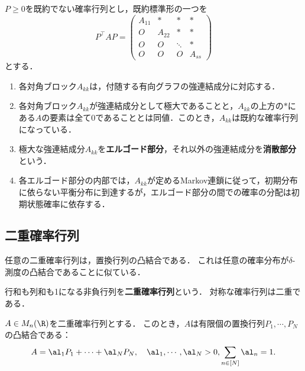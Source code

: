 \documentclass[uplatex, dvipdfmx]{jsreport}
\begin{document}
\begin{definition}
    $P\ge0$を既約でない確率行列とし，既約標準形の一つを
    \[P^\top AP=\begin{pmatrix}A_{11}&*&*&*\\O&A_{22}&*&*\\O&O&\ddots&*\\O&O&O&A_{ss}\end{pmatrix}\]
    とする．
    \begin{enumerate}
        \item 各対角ブロック$A_{kk}$は，付随する有向グラフの強連結成分に対応する．
        \item 各対角ブロック$A_{kk}$が強連結成分として極大であることと，$A_{kk}$の上方の$*$にある$A$の要素は全て$0$であることとは同値．このとき，$A_{kk}$は既約な確率行列になっている．
        \item 極大な強連結成分$A_{kk}$を\textbf{エルゴード部分}，それ以外の強連結成分を\textbf{消散部分}という．
        \item 各エルゴード部分の内部では，$A_{kk}$が定めるMarkov連鎖に従って，初期分布に依らない平衡分布に到達するが，エルゴード部分の間での確率の分配は初期状態確率に依存する．
    \end{enumerate}
\end{definition}

\subsection{二重確率行列}

\begin{tcolorbox}[colframe=ForestGreen, colback=ForestGreen!10!white,breakable,colbacktitle=ForestGreen!40!white,coltitle=black,fonttitle=\bfseries\sffamily,
title=]
    任意の二重確率行列は，置換行列の凸結合である．
    これは任意の確率分布が$\delta$-測度の凸結合であることに似ている．
\end{tcolorbox}

\begin{definition}
    行和も列和も1になる非負行列を\textbf{二重確率行列}という．
    対称な確率行列は二重である．
\end{definition}

\begin{theorem}[Birkhoff]
    $A\in M_n(\R)$を二重確率行列とする．
    このとき，$A$は有限個の置換行列$P_1,\cdots,P_N$の凸結合である：
    \[A=\al_1P_1+\cdots+\al_NP_N,\quad \al_1,\cdots,\al_N>0,\sum_{n\in[N]}\al_n=1.\]
\end{theorem}
\end{document}
